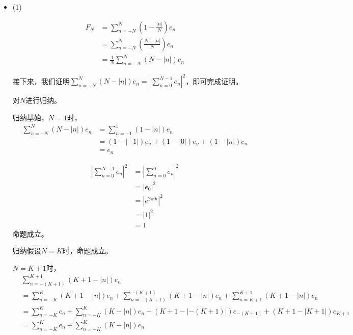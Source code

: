 \documentclass{article}
\begin{document}
\begin{itemize}
  \item (1)

        \begin{align*}
          F_N & = \sum \limits_{n = -N}^{N} (1 - \frac{|n|}{N})e_n   \\
              & = \sum \limits_{n = -N}^{N} (\frac{N - |n|}{N})e_n   \\
              & = \frac{1}{N} \sum \limits_{n = -N}^{N} (N - |n|)e_n
        \end{align*}

        接下来，我们证明$\sum \limits_{n = -N}^{N} (N - |n|)e_n = |\sum \limits_{n = 0}^{N-1} e_n|^2$，即可完成证明。

        对$N$进行归纳。

        归纳基始，$N = 1$时，
        \begin{align*}
          \sum \limits_{n = -N}^{N} (N - |n|)e_n
           & = \sum \limits_{n = -1}^{1} (1 - |n|)e_n      \\
           & = (1 - |-1|)e_n + (1 - |0|)e_n + (1 - |n|)e_n \\
           & = e_n
        \end{align*}

        \begin{align*}
          |\sum \limits_{n = 0}^{N-1} e_n|^2
           & = \left|\sum\limits_{n = 0}^{0}e_n\right|^2 \\
           & = |e_0|^2                                   \\
           & = |e^{2\pi 0 i}|^2                          \\
           & = |1|^2                                     \\
           & = 1
        \end{align*}
        命题成立。

        归纳假设$N = K$时，命题成立。

        $N = K + 1$时，
        \begin{align*}
           & \sum \limits_{n = -(K + 1)}^{K + 1} (K + 1 - |n|)e_n                     \\
           & = \sum \limits_{n = -K}^{K} (K + 1 - |n|)e_n
          + \sum \limits_{n = -(K + 1)}^{-(K + 1)} (K + 1 - |n|)e_n
          + \sum \limits_{n = K + 1}^{K + 1} (K + 1 - |n|)e_n                         \\
           & = \sum \limits_{n = -K}^{K} e_n + \sum \limits_{n = -K}^{K} (K - |n|)e_n
          +  (K + 1 - |-(K + 1)|)e_{-(K + 1)}
          +  (K + 1 - |K + 1|)e_{K + 1}                                               \\
           & = \sum \limits_{n = -K}^{K} e_n + \sum \limits_{n = -K}^{K} (K - |n|)e_n
        \end{align*}


\end{itemize}
\end{document}
